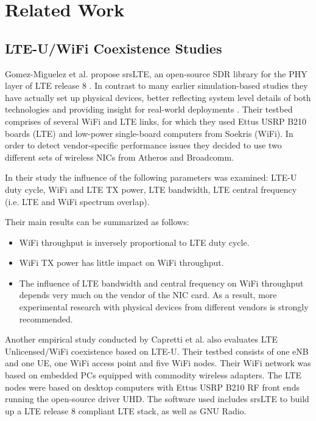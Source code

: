 \chapter{Related Work}

\section{LTE-U/WiFi Coexistence Studies}

Gomez-Miguelez et al. propose srsLTE, an open-source SDR library for the PHY layer of LTE release 8 \cite{gomezmiguelez16}. In contrast to many earlier simulation-based studies they have actually set up physical devices, better reflecting system level details of both technologies and providing insight for real-world deployments \cite{rupasinghe14} \cite{nihtilä13} \cite{jeon14} \cite{cavalcante13} . Their testbed comprises of several WiFi and LTE links, for which they used Ettus USRP B210 boards (LTE) and low-power single-board computers from Soekris (WiFi). In order to detect vendor-specific performance issues they decided to use two different sets of wireless NICs from Atheros and Broadcomm.

In their study the influence of the following parameters was examined: LTE-U duty cycle, WiFi and LTE TX power, LTE bandwidth, LTE central frequency (i.e. LTE and WiFi spectrum overlap).

Their main results can be summarized as follows:

\begin{itemize}
	\item WiFi throughput is inversely proportional to LTE duty cycle.
	\item WiFi TX power has little impact on WiFi throughput.
	\item The influence of LTE bandwidth and central frequency on WiFi throughput depends very much on the vendor of the NIC card. As a result, more experimental research with physical devices from different vendors is strongly recommended. 
\end{itemize}

Another empirical study \cite{capretti16} conducted by Capretti et al. also evaluates LTE Unlicensed/WiFi coexistence based on LTE-U.  Their testbed consists of one eNB and one UE, one WiFi access point and five WiFi nodes. Their WiFi network was based on embedded PCs equipped with commodity wireless adapters. The LTE nodes were based on desktop computers with Ettus USRP B210 RF front ends running the open-source driver UHD. The software used includes srsLTE to build up a LTE release 8 compliant LTE stack, as well as GNU Radio. 

